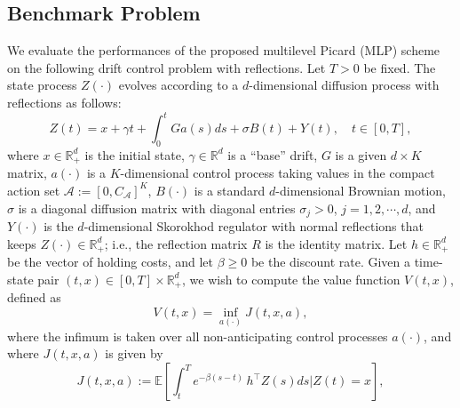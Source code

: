 \documentclass[11pt]{article}
\theoremstyle{definition}
\theoremstyle{plain}
\newcommand{\R}{\mathbb{R}}
\begin{document}
\subsection{Benchmark Problem}\label{ssec:benchmark}
We evaluate the performances of the proposed multilevel Picard (MLP) scheme on the following drift control problem with reflections. 
Let $T > 0$ be fixed.
The state process $Z(\cdot)$ evolves according to a $d$-dimensional diffusion process with reflections as follows:
\begin{equation}\label{eq:pss-dcr1}
    Z(t) = x + \gamma t + \int_0^t Ga(s) ds + \sigma B(t) + Y(t), \quad t \in [0,T],
\end{equation}
where $x \in \R_+^d$ is the initial state, $\gamma \in \R^d$ is a ``base'' drift, $G$ is a given $d\times K$ matrix, 
$a(\cdot)$ is a $K$-dimensional control process taking values in the compact action set $\mathcal{A}:=\left[0,C_\mathcal{A}\right]^K$, 
$B(\cdot)$ is a standard $d$-dimensional Brownian motion, $\sigma$ is a diagonal diffusion matrix with diagonal entries $\sigma_j > 0$, $j=1,2,\cdots,d$, 
and $Y(\cdot)$ is the $d$-dimensional Skorokhod regulator with normal reflections 
that keeps $Z(\cdot) \in \R_+^d$; i.e., the reflection matrix $R$ is the identity matrix. 
Let $h \in \R_+^d$ be the vector of holding costs, and let $\beta \geq 0$ be the discount rate. 
Given a time-state pair $(t,x) \in [0,T] \times \R_+^d$, we wish to compute the value function $V(t,x)$, defined as 
\begin{equation}\label{eq:pss-dcr2}
V(t,x) = \inf_{a(\cdot)} J(t,x,a), 
\end{equation}
where the infimum is taken over all non-anticipating control processes $a(\cdot)$, and where $J(t,x,a)$ is given by
\begin{equation}\label{eq:pss-dcr3}
    J(t,x,a) := \mathbb{E} \left[ \int_t^T e^{-\beta (s-t)}\, h^{\top} Z(s) ds\Big| Z(t)=x \right],
\end{equation}
\end{document}
